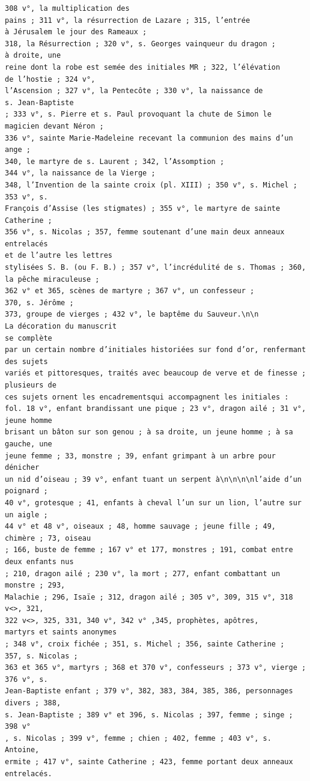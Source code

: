 \documentclass[a4paper,12pt,twoside]{book}
\begin{document}
\begin{verbatim}
308 v°, la multiplication des
pains ; 311 v°, la résurrection de Lazare ; 315, l’entrée
à Jérusalem le jour des Rameaux ;
318, la Résurrection ; 320 v°, s. Georges vainqueur du dragon ;
à droite, une
reine dont la robe est semée des initiales MR ; 322, l’élévation 
de l’hostie ; 324 v°,
l’Ascension ; 327 v°, la Pentecôte ; 330 v°, la naissance de
s. Jean-Baptiste 
; 333 v°, s. Pierre et s. Paul provoquant la chute de Simon le
magicien devant Néron ;
336 v°, sainte Marie-Madeleine recevant la communion des mains d’un ange ;
340, le martyre de s. Laurent ; 342, l’Assomption ; 
344 v°, la naissance de la Vierge ;
348, l’Invention de la sainte croix (pl. XIII) ; 350 v°, s. Michel ;
353 v°, s.
François d’Assise (les stigmates) ; 355 v°, le martyre de sainte Catherine ;
356 v°, s. Nicolas ; 357, femme soutenant d’une main deux anneaux entrelacés
et de l’autre les lettres 
stylisées S. B. (ou F. B.) ; 357 v°, l’incrédulité de s. Thomas ; 360,
la pêche miraculeuse ;
362 v° et 365, scènes de martyre ; 367 v°, un confesseur ; 
370, s. Jérôme ;
373, groupe de vierges ; 432 v°, le baptême du Sauveur.\n\n
La décoration du manuscrit
se complète
par un certain nombre d’initiales historiées sur fond d’or, renfermant des sujets
variés et pittoresques, traités avec beaucoup de verve et de finesse ; plusieurs de 
ces sujets ornent les encadrementsqui accompagnent les initiales : 
fol. 18 v°, enfant brandissant une pique ; 23 v°, dragon ailé ; 31 v°, jeune homme
brisant un bâton sur son genou ; à sa droite, un jeune homme ; à sa gauche, une 
jeune femme ; 33, monstre ; 39, enfant grimpant à un arbre pour dénicher 
un nid d’oiseau ; 39 v°, enfant tuant un serpent à\n\n\n\nl’aide d’un poignard ;
40 v°, grotesque ; 41, enfants à cheval l’un sur un lion, l’autre sur un aigle ; 
44 v° et 48 v°, oiseaux ; 48, homme sauvage ; jeune fille ; 49, chimère ; 73, oiseau 
; 166, buste de femme ; 167 v° et 177, monstres ; 191, combat entre deux enfants nus
; 210, dragon ailé ; 230 v°, la mort ; 277, enfant combattant un monstre ; 293, 
Malachie ; 296, Isaïe ; 312, dragon ailé ; 305 v°, 309, 315 v°, 318 v<>, 321,
322 v<>, 325, 331, 340 v°, 342 v° ,345, prophètes, apôtres,
martyrs et saints anonymes 
; 348 v°, croix fichée ; 351, s. Michel ; 356, sainte Catherine ;
357, s. Nicolas ; 
363 et 365 v°, martyrs ; 368 et 370 v°, confesseurs ; 373 v°, vierge ; 376 v°, s.
Jean-Baptiste enfant ; 379 v°, 382, 383, 384, 385, 386, personnages divers ; 388,
s. Jean-Baptiste ; 389 v° et 396, s. Nicolas ; 397, femme ; singe ; 398 v°
, s. Nicolas ; 399 v°, femme ; chien ; 402, femme ; 403 v°, s. Antoine,
ermite ; 417 v°, sainte Catherine ; 423, femme portant deux anneaux entrelacés. 

\end{verbatim}
\end{document}
